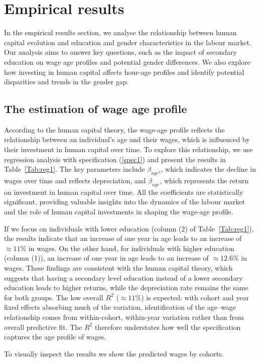 \documentclass[12pt]{article}
\begin{document}
\section{Empirical results}
In the empirical results section, we analyse the relationship between human capital evolution and education and gender
characteristics in the labour market. Our analysis aims to answer key questions, such as the impact of secondary
education on wage age profiles and potential gender differences. We also explore how investing in human capital affects
hour-age profiles and identify potential disparities and trends in the gender gap.
\subsection{The estimation of wage age profile}
According to the human capital theory, the wage-age profile reflects the relationship between an individual's age and
their wages, which is influenced by their investment in human capital over time. To explore this relationship, we use
regression analysis with specification (\ref{spec1}) and present the results in Table~\ref{Tab:reg1}. The key parameters
include $\beta_{age^2}$, which indicates the decline in wages over time and reflects depreciation, and $\beta_{age}$,
which represents the return on investment in human capital over time. All the coefficients are statistically
significant, providing valuable insights into the dynamics of the labour market and the role of human capital investments
in shaping the wage-age profile.
\par
If we focus on individuals with lower education (column (2) of Table~\ref{Tab:reg1}), the results indicate that an
increase of one year in age leads to an increase of $\approx 11\%$ in wages. On the other hand, for individuals with
higher education (column (1)), an increase of one year in age leads to an increase of $\approx 12.6\%$ in wages.
These findings are consistent with the human capital theory, which suggests that having a secondary level education
instead of a lower secondary education leads to higher returns, while the depreciation rate remains the same for both
groups. The low overall $R^2$ ($\approx 11\%$) is expected: with cohort and year fixed effects absorbing much of the
variation, identification of the age--wage relationship comes from within-cohort, within-year variation rather than from
overall predictive fit. The $R^2$ therefore understates how well the specification captures the age profile of wages.
\par
To visually inspect the results we show the predicted wages by cohorts.
\end{document}
